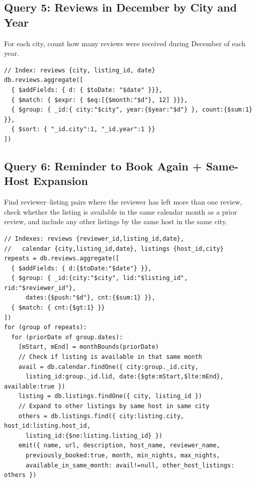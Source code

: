 \documentclass[10pt]{article}
\begin{document}
\subsection{Query 5: Reviews in December by City and Year}

For each city, count how many reviews were received during December of each year.

\begin{lstlisting}
// Index: reviews {city, listing_id, date}
db.reviews.aggregate([
  { $addFields: { d: { $toDate: "$date" }}},
  { $match: { $expr: { $eq:[{$month:"$d"}, 12] }}},
  { $group: { _id:{ city:"$city", year:{$year:"$d"} }, count:{$sum:1} }},
  { $sort: { "_id.city":1, "_id.year":1 }}
])
\end{lstlisting}

\subsection{Query 6: Reminder to Book Again + Same-Host Expansion}

Find reviewer--listing pairs where the reviewer has left more than one review, check whether the listing is available in the same calendar month as a prior review, and include any other listings by the same host in the same city.

\begin{lstlisting}
// Indexes: reviews {reviewer_id,listing_id,date},
//   calendar {city,listing_id,date}, listings {host_id,city}
repeats = db.reviews.aggregate([
  { $addFields: { d:{$toDate:"$date"} }},
  { $group: { _id:{city:"$city", lid:"$listing_id", rid:"$reviewer_id"},
      dates:{$push:"$d"}, cnt:{$sum:1} }},
  { $match: { cnt:{$gt:1} }}
])
for (group of repeats):
  for (priorDate of group.dates):
    [mStart, mEnd] = monthBounds(priorDate)
    // Check if listing is available in that same month
    avail = db.calendar.findOne({ city:group._id.city,
      listing_id:group._id.lid, date:{$gte:mStart,$lte:mEnd}, available:true })
    listing = db.listings.findOne({ city, listing_id })
    // Expand to other listings by same host in same city
    others = db.listings.find({ city:listing.city, host_id:listing.host_id,
      listing_id:{$ne:listing.listing_id} })
    emit({ name, url, description, host_name, reviewer_name,
      previously_booked:true, month, min_nights, max_nights,
      available_in_same_month: avail!=null, other_host_listings: others })
\end{lstlisting}


\end{document}
